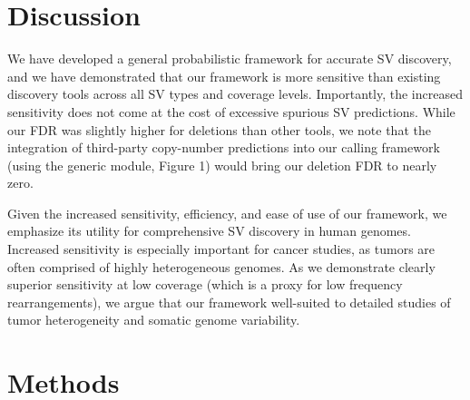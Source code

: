 \documentclass[11pt]{article}
\begin{document}
\section{Discussion}
We have developed a general probabilistic framework for accurate SV discovery, 
and we have demonstrated that our framework is more sensitive than existing 
discovery tools across all SV types and coverage levels. Importantly, the
increased sensitivity does not come at the cost of excessive spurious SV
predictions. While our FDR was slightly higher for deletions than other tools,
we note that the integration of third-party copy-number predictions into
our calling framework (using the generic module, Figure 1) would bring our 
deletion FDR to nearly zero.

Given the increased sensitivity, efficiency, and ease of use of our framework, 
we emphasize its utility for comprehensive SV discovery in human genomes. 
Increased sensitivity is especially important for cancer studies, as tumors are 
often comprised of highly heterogeneous genomes. As we demonstrate clearly
superior sensitivity at low coverage (which is a proxy for low frequency 
rearrangements), we argue that our framework well-suited to detailed studies
of tumor heterogeneity and somatic genome variability.







\section{Methods}
\end{document}
